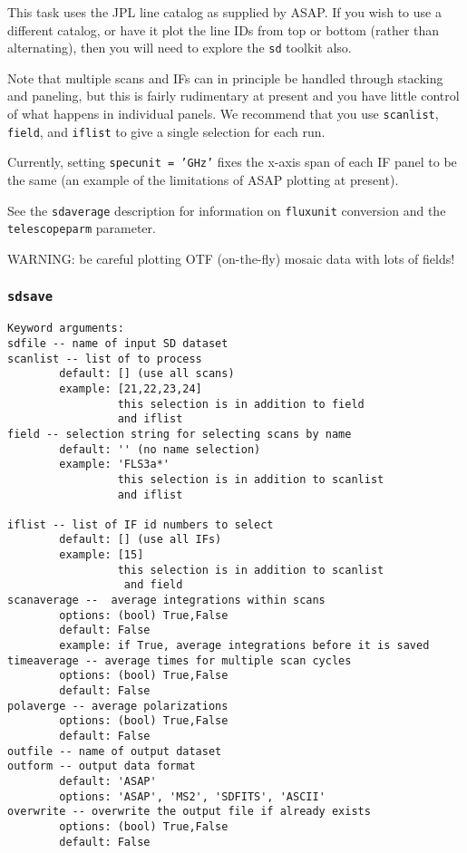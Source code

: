     This task uses the JPL line catalog as supplied by ASAP.
    If you wish to use a different catalog, or have it plot
    the line IDs from top or bottom (rather than alternating),
    then you will need to explore the {\tt sd} toolkit also.	
    
    Note that multiple scans and IFs can in principle be handled
    through stacking and paneling, but this is fairly rudimentary
    at present and you have little control of what happens in
    individual panels.  We recommend that you use {\tt scanlist}, 
    {\tt field}, and {\tt iflist} to give a single selection for each run.
    
    Currently, setting {\tt specunit = 'GHz'} fixes the x-axis span of
    each IF panel to be the same (an example of the limitations
    of ASAP plotting at present).
    
    See the {\tt sdaverage} description for information on {\tt fluxunit} 
    conversion and the {\tt telescopeparm} parameter.

    WARNING: be careful plotting OTF (on-the-fly) mosaic data with 
    lots of fields!

\subsubsection{{\tt sdsave}}
\label{section:sd.sdtasks.tasks.sdsave}

\begin{verbatim}
Keyword arguments:
sdfile -- name of input SD dataset
scanlist -- list of to process
        default: [] (use all scans)
        example: [21,22,23,24]
                 this selection is in addition to field
                 and iflist
field -- selection string for selecting scans by name
        default: '' (no name selection)
        example: 'FLS3a*'
                 this selection is in addition to scanlist
                 and iflist

iflist -- list of IF id numbers to select
        default: [] (use all IFs)
        example: [15]
                 this selection is in addition to scanlist
                  and field
scanaverage --  average integrations within scans
        options: (bool) True,False
        default: False
        example: if True, average integrations before it is saved
timeaverage -- average times for multiple scan cycles
        options: (bool) True,False
        default: False
polaverge -- average polarizations
        options: (bool) True,False
        default: False
outfile -- name of output dataset
outform -- output data format
        default: 'ASAP'
        options: 'ASAP', 'MS2', 'SDFITS', 'ASCII'
overwrite -- overwrite the output file if already exists
        options: (bool) True,False
        default: False

\end{verbatim}

